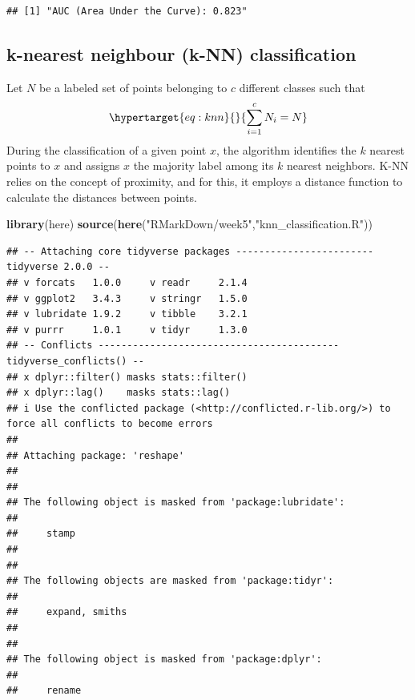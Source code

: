 \documentclass[a4paper,conference]{IEEEtran}
\newenvironment{Shaded}{\begin{snugshade}}{\end{snugshade}}
\newcommand{\FunctionTok}[1]{\textcolor[rgb]{0.13,0.29,0.53}{\textbf{#1}}}
\newcommand{\NormalTok}[1]{#1}
\newcommand{\StringTok}[1]{\textcolor[rgb]{0.31,0.60,0.02}{#1}}
\begin{document}
\begin{verbatim}
## [1] "AUC (Area Under the Curve): 0.823"
\end{verbatim}

\hypertarget{sec:k-nearest-neighbour-k-nn-classification}{%
\subsection{k-nearest neighbour (k-NN)
classification}\label{sec:k-nearest-neighbour-k-nn-classification}}

Let \(N\) be a labeled set of points belonging to \(c\) different
classes such that
\begin{equation}\protect\hypertarget{eq:knn}{}{ \sum_{i=1}^{c} N_i = N }\end{equation}
During the classification of a given point \(x\), the algorithm
identifies the \(k\) nearest points to \(x\) and assigns \(x\) the
majority label among its \(k\) nearest neighbors. K-NN relies on the
concept of proximity, and for this, it employs a distance function to
calculate the distances between points.

\begin{Shaded}
\begin{Highlighting}[]
\FunctionTok{library}\NormalTok{(here)}
\FunctionTok{source}\NormalTok{(}\FunctionTok{here}\NormalTok{(}\StringTok{"RMarkDown/week5"}\NormalTok{,}\StringTok{"knn\_classification.R"}\NormalTok{))}
\end{Highlighting}
\end{Shaded}

\begin{verbatim}
## -- Attaching core tidyverse packages ------------------------ tidyverse 2.0.0 --
## v forcats   1.0.0     v readr     2.1.4
## v ggplot2   3.4.3     v stringr   1.5.0
## v lubridate 1.9.2     v tibble    3.2.1
## v purrr     1.0.1     v tidyr     1.3.0
## -- Conflicts ------------------------------------------ tidyverse_conflicts() --
## x dplyr::filter() masks stats::filter()
## x dplyr::lag()    masks stats::lag()
## i Use the conflicted package (<http://conflicted.r-lib.org/>) to force all conflicts to become errors
## 
## Attaching package: 'reshape'
## 
## 
## The following object is masked from 'package:lubridate':
## 
##     stamp
## 
## 
## The following objects are masked from 'package:tidyr':
## 
##     expand, smiths
## 
## 
## The following object is masked from 'package:dplyr':
## 
##     rename
\end{verbatim}
\end{document}
